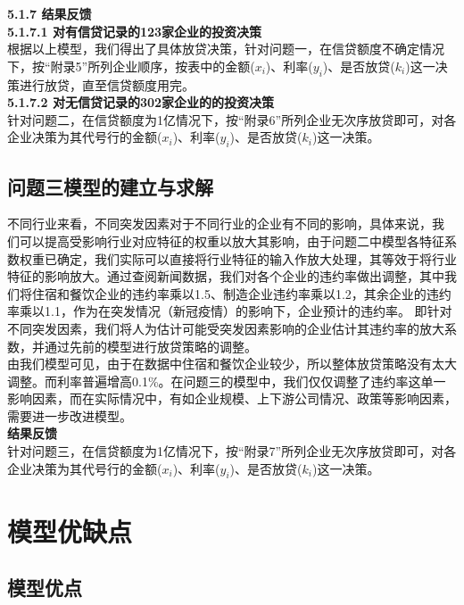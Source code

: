 \documentclass[bwprint]{cumcm}
\begin{document}
\noindent \textbf{ 5.1.7 结果反馈}\\
\noindent \textbf{ 5.1.7.1 对有信贷记录的123家企业的投资决策}\\
根据以上模型，我们得出了具体放贷决策，针对问题一，在信贷额度不确定情况下，按“附录5”所列企业顺序，按表中的金额($x_i$)、利率($y_i$)、是否放贷($k_i$)这一决策进行放贷，直至信贷额度用完。\\
\noindent \textbf{ 5.1.7.2 对无信贷记录的302家企业的的投资决策}\\
针对问题二，在信贷额度为1亿情况下，按“附录6”所列企业无次序放贷即可，对各企业决策为其代号行的金额($x_i$)、利率($y_i$)、是否放贷($k_i$)这一决策。


\subsection{\heiti 问题三模型的建立与求解}

不同行业来看，不同突发因素对于不同行业的企业有不同的影响，具体来说，我 们可以提高受影响行业对应特征的权重以放大其影响，由于问题二中模型各特征系数权重已确定，我们实际可以直接将行业特征的输入作放大处理，其等效于将行业特征的影响放大。通过查阅新闻数据，我们对各个企业的违约率做出调整，其中我们将住宿和餐饮企业的违约率乘以1.5、制造企业违约率乘以1.2，其余企业的违约率乘以1.1，作为在突发情况（新冠疫情）的影响下，企业预计的违约率。
即针对不同突发因素，我们将人为估计可能受突发因素影响的企业估计其违约率的放大系数，并通过先前的模型进行放贷策略的调整。\\
\indent 由我们模型可见，由于在数据中住宿和餐饮企业较少，所以整体放贷策略没有太大调整。而利率普遍增高0.1\%。在问题三的模型中，我们仅仅调整了违约率这单一影响因素，而在实际情况中，有如企业规模、上下游公司情况、政策等影响因素，需要进一步改进模型。\\

\noindent \textbf{  结果反馈}\\
针对问题三，在信贷额度为1亿情况下，按“附录7”所列企业无次序放贷即可，对各企业决策为其代号行的金额($x_i$)、利率($y_i$)、是否放贷($k_i$)这一决策。





\section{\heiti 模型优缺点}
\subsection{\heiti 模型优点}
\end{document}
